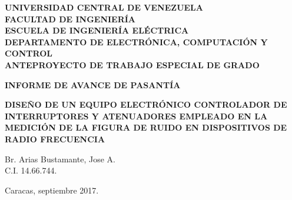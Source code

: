 \documentclass[paper=letter,oneside,fontsize=12pt, parskip=full]{article}
\begin{document}
		
		
			
		\begin{titlepage}
		
		\begin{center}		
			
			\begin{large}							
				\bfseries
				\uppercase{Universidad Central de Venezuela} \\			
				\uppercase{Facultad de Ingeniería} \\							
				\uppercase{Escuela de Ingeniería Eléctrica} \\
        		\uppercase{Departamento de Electrónica, Computación y Control} \\
        		\uppercase{Anteproyecto de Trabajo Especial de Grado}          	
			\end{large}			
		
			\vfill
			
			\begin{large}
				\bfseries
				\uppercase{Informe de Avance de Pasantía}
			\end{large}
		
			\vspace{2mm}
			
			\begin{Large}
				\begin{spacing}{1.2}
					\bfseries				
		      		\uppercase{Diseño de un equipo electrónico controlador de interruptores y atenuadores empleado en la medición de la figura de ruido en dispositivos de radio frecuencia}	
		      	\end{spacing}
			\end{Large}					
			
			\vfill
			
			\begin{flushright}
				Br. Arias Bustamante, Jose A. \\
				C.I. 14.66.744.
			\end{flushright}
		
			\vfill
			
			\begin{center}
				Caracas, septiembre 2017.
			\end{center}
		
		\end{center}
	
	\end{titlepage}
	
\end{document}
